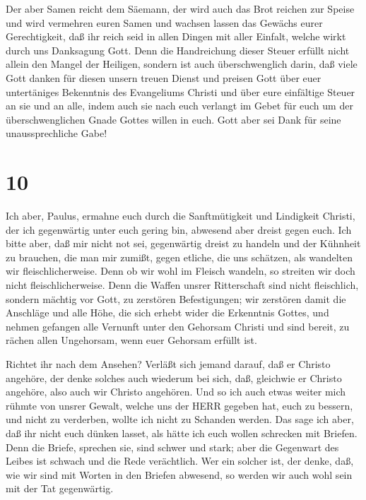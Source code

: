  Der aber Samen reicht dem Säemann, der wird auch das Brot
reichen zur Speise und wird vermehren euren Samen und wachsen lassen das
Gewächs eurer Gerechtigkeit,  daß ihr reich seid in allen
Dingen mit aller Einfalt, welche wirkt durch uns Danksagung Gott.
 Denn die Handreichung dieser Steuer erfüllt nicht allein
den Mangel der Heiligen, sondern ist auch überschwenglich darin, daß
viele Gott danken für diesen unsern treuen Dienst  und
preisen Gott über euer untertäniges Bekenntnis des Evangeliums Christi
und über eure einfältige Steuer an sie und an alle,  indem
auch sie nach euch verlangt im Gebet für euch um der überschwenglichen
Gnade Gottes willen in euch.  Gott aber sei Dank für seine
unaussprechliche Gabe!

\hypertarget{section-9}{%
\section{10}\label{section-9}}

 Ich aber, Paulus, ermahne euch durch die Sanftmütigkeit und
Lindigkeit Christi, der ich gegenwärtig unter euch gering bin, abwesend
aber dreist gegen euch.  Ich bitte aber, daß mir nicht not
sei, gegenwärtig dreist zu handeln und der Kühnheit zu brauchen, die man
mir zumißt, gegen etliche, die uns schätzen, als wandelten wir
fleischlicherweise.  Denn ob wir wohl im Fleisch wandeln, so
streiten wir doch nicht fleischlicherweise.  Denn die Waffen
unsrer Ritterschaft sind nicht fleischlich, sondern mächtig vor Gott, zu
zerstören Befestigungen;  wir zerstören damit die Anschläge
und alle Höhe, die sich erhebt wider die Erkenntnis Gottes, und nehmen
gefangen alle Vernunft unter den Gehorsam Christi  und sind
bereit, zu rächen allen Ungehorsam, wenn euer Gehorsam erfüllt ist.

 Richtet ihr nach dem Ansehen? Verläßt sich jemand darauf,
daß er Christo angehöre, der denke solches auch wiederum bei sich, daß,
gleichwie er Christo angehöre, also auch wir Christo angehören.
 Und so ich auch etwas weiter mich rühmte von unsrer Gewalt,
welche uns der HERR gegeben hat, euch zu bessern, und nicht zu
verderben, wollte ich nicht zu Schanden werden.  Das sage
ich aber, daß ihr nicht euch dünken lasset, als hätte ich euch wollen
schrecken mit Briefen.  Denn die Briefe, sprechen sie, sind
schwer und stark; aber die Gegenwart des Leibes ist schwach und die Rede
verächtlich.  Wer ein solcher ist, der denke, daß, wie wir
sind mit Worten in den Briefen abwesend, so werden wir auch wohl sein
mit der Tat gegenwärtig.

